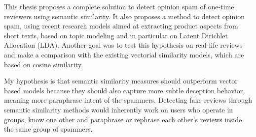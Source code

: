 This thesis proposes a complete solution to detect opinion spam of one-time reviewers using semantic similarity. It also proposes a method to detect opinion spam, using recent research models aimed at extracting product aspects from short texts, based on topic modeling and in particular on Latent Dirichlet Allocation (LDA). Another goal was to test this hypothesis on real-life reviews and make a comparison with the existing vectorial similarity models, which are based on cosine similarity. 

My hypothesis is that semantic similarity measures should outperform vector based models because they should also capture more subtle deception behavior, meaning more paraphrase intent of the spammers. Detecting fake reviews through semantic similarity methods would inherently work on users who operate in groups, know one other and paraphrase or rephrase each other's reviews inside the same group of spammers.